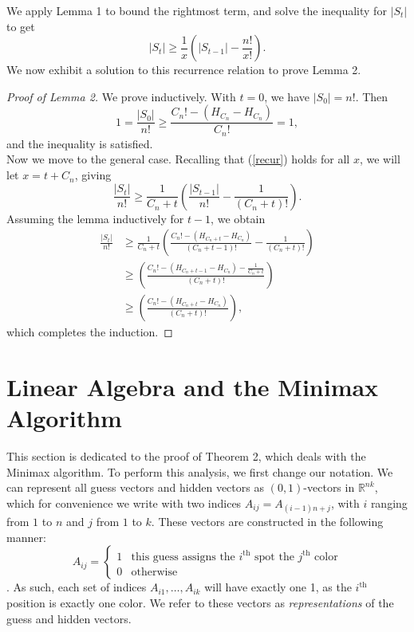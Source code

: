 \documentclass[12pt, a4paper]{article}
\newcommand{\R}{\mathbb{R}}           %
\begin{document}
		We apply Lemma 1 to bound the rightmost term, and solve the inequality for $|S_t|$ to get 
		\begin{equation}\label{recur}
			|S_t| \ge \frac{1}{x}\left(|S_{t-1}|-\frac{n!}{x!}\right).
		\end{equation}
		We now exhibit a solution to this recurrence relation to prove Lemma 2.
		
		\begin{proof}[Proof of Lemma 2] We prove inductively. With $t=0$, we have $|S_0| = n!$. Then
			\begin{equation*}
			1 =\frac{|S_0|}{n!}\ge \frac{C_{n}! - (H_{C_{n}}-H_{C_{n}})}{C_{n}!} = 1,
			\end{equation*}
			and the inequality is satisfied. \\
			Now we move to the general case.
			Recalling that (\ref{recur}) holds for all $x$, we will
		let $x=t+C_{n}$, giving
			\begin{equation*}
			\frac{|S_t|}{n!}
			 \ge \frac{1}{C_{n}+t}\left(\frac{|S_{t-1}|}{n!}
			-\frac{1}{(C_{n}+t)!}\right).
			\end{equation*}
		Assuming the lemma inductively for $t-1$, we obtain
			\begin{align*}
			\frac{|S_t|}{n!}
			& \ge \frac{1}{C_{n}+t}\left(\frac{C_{n}!-(H_{C_{n}+t} - H_{C_{n}})}
			{(C_{n}+t-1)!} - \frac{1}{(C_{n}+t)!}\right)\\
			& \ge \left(\frac{C_{n}! - (H_{C_{n}+t-1} - H_{C_{n}}) - \frac{1}{C_{n}+t}}
			{(C_{n}+t)!}\right)\\
			& \ge \left(\frac{C_{n}! - (H_{C_{n}+t} - H_{C_{n}})}{(C_{n}+t)!}\right),
			\end{align*}
			which completes the induction.
		\end{proof}
\section{Linear Algebra and the Minimax Algorithm}
This section is dedicated to the proof of Theorem 2, which deals with the Minimax algorithm. To perform this analysis, we first change our notation. We can represent all guess vectors and hidden vectors as $(0,1)$-vectors in $\R^{nk}$, which for convenience we write with two indices $A_{ij} = A_{(i-1)n+j}$, with $i$ ranging from $1$ to $n$ and $j$ from $1$ to $k$.  These vectors are constructed in the following manner: 
$$
A_{ij} = \begin{cases}
1 & \text{this guess assigns the $i^\text{th}$ spot the $j^\text{th}$ color} \\
0 & \text{otherwise}
\end{cases}
$$. As such, each set of indices $A_{i1},\dots,A_{ik}$ will have exactly one 1, as the $i^\text{th}$ position is exactly one color. We refer to these vectors as \textit{representations} of the guess and hidden vectors.
\end{document}
